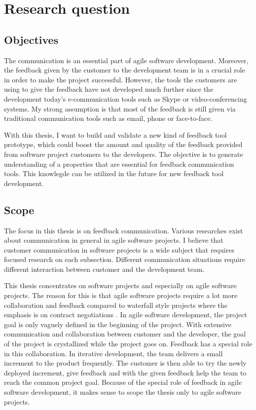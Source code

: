 \documentclass[english,12pt,a4paper,pdftex]{article}
\begin{document}
\clearpage

\section{Research question}
\label{sec:research_question}
\acresetall

\subsection{Objectives}

The communication is an essential part of agile software development. Moreover, the feedback given by the customer to the development team is in a crucial role in order to make the project successful. However, the tools the customers are using to give the feedback have not developed much further since the development today's e-communication tools such as Skype or video-conferencing systems. My strong assumption is that most of the feedback is still given via traditional communication tools such as email, phone or face-to-face.

With this thesis, I want to build and validate a new kind of feedback tool prototype, which could boost the amount and quality of the feedback provided from software project customers to the developers. The objective is to generate understanding of a properties that are essential for feedback communication tools. This knowlegde can be utilized in the future for new feedback tool development.

\subsection{Scope}

The focus in this thesis is on feedback communication. Various researches exist about communication in general in agile software projects. I believe that customer communication in software projects is a wide subject that requires focused research on each subsection. Different communication situations require different interaction between customer and the development team. 

This thesis concentrates on software projects and especially on agile software projects. The reason for this is that agile software projects require a lot more collaboration and feedback compared to waterfall style projects where the emphasis is on contract negotiations \citep{larman2004}. In agile software development, the project goal is only vaguely defined in the beginning of the project. With extensive communication and collaboration between customer and the developer, the goal of the project is crystallized while the project goes on. Feedback has a special role in this collaboration. In iterative development, the team delivers a small increment to the product frequently. The customer is then able to try the newly deployed increment, give feedback and with the given feedback help the team to reach the common project goal. Because of the special role of feedback in agile software development, it makes sense to scope the thesis only to agile software projects.
\end{document}
